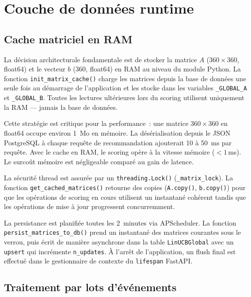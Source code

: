 \section{Couche de données runtime}

\subsection{Cache matriciel en RAM}

La décision architecturale fondamentale est de stocker la matrice $A$ ($360 \times 360$,
float64) et le vecteur $b$ (360, float64) en RAM au niveau du module Python. La fonction
\texttt{init\_matrix\_cache()} charge les matrices depuis la base de données une seule fois
au démarrage de l'application et les stocke dans les variables \texttt{\_GLOBAL\_A} et
\texttt{\_GLOBAL\_B}. Toutes les lectures ultérieures lors du scoring utilisent uniquement
la RAM --- jamais la base de données.

Cette stratégie est critique pour la performance~: une matrice $360 \times 360$ en float64
occupe environ 1~Mo en mémoire. La désérialisation depuis le JSON PostgreSQL à chaque
requête de recommandation ajouterait 10 à 50~ms par requête. Avec le cache en RAM, le scoring
opère à la vitesse mémoire ($<1$\,ms). Le surcoût mémoire est négligeable comparé au gain
de latence.

La sécurité thread est assurée par un \texttt{threading.Lock()} (\texttt{\_matrix\_lock}).
La fonction \texttt{get\_cached\_matrices()} retourne des copies (\texttt{A.copy()},
\texttt{b.copy()}) pour que les opérations de scoring en cours utilisent un instantané
cohérent tandis que les opérations de mise à jour progressent concurremment.

La persistance est planifiée toutes les 2~minutes via APScheduler. La fonction
\texttt{persist\_matrices\_to\_db()} prend un instantané des matrices courantes sous le
verrou, puis écrit de manière asynchrone dans la table \texttt{LinUCBGlobal} avec un
\texttt{upsert} qui incrémente \texttt{n\_updates}. À l'arrêt de l'application, un flush
final est effectué dans le gestionnaire de contexte du \texttt{lifespan} FastAPI.


\subsection{Traitement par lots d'événements}

